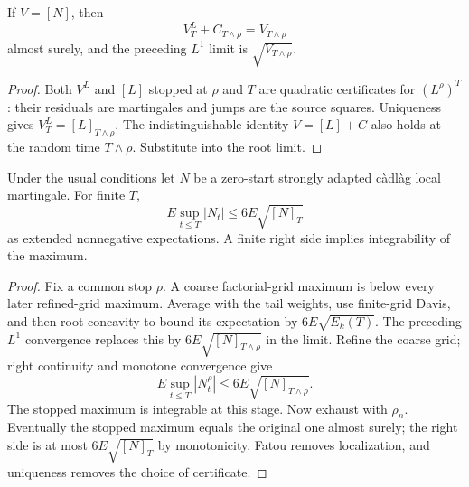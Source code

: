 \begin{lemma}
If $V=[N]$, then
\[
 V^L_T+C_{T\wedge\rho}=V_{T\wedge\rho}
\]
 almost surely,
and the preceding $L^1$ limit is $\sqrt{V_{T\wedge\rho}}$.
\end{lemma}
\begin{proof}
Both $V^L$ and $[L]$ stopped at $\rho$ and $T$ are quadratic certificates
for $(L^\rho)^T$: their residuals are martingales and jumps are the source
squares. Uniqueness gives $V^L_T=[L]_{T\wedge\rho}$.
The indistinguishable identity $V=[L]+C$ also holds at the random time
$T\wedge\rho$. Substitute into the root limit.
\end{proof}
\begin{lemma}
Under the usual conditions let $N$ be a zero-start strongly adapted
c\`adl\`ag local martingale. For finite $T$,
\[
 E\sup_{t\leq T}|N_t|\leq6E\sqrt{[N]_T}
\]
 as extended
nonnegative expectations. A finite right side implies integrability of the maximum.
\end{lemma}
\begin{proof}
Fix a common stop $\rho$. A coarse factorial-grid maximum is below every
later refined-grid maximum. Average with the tail weights, use finite-grid
Davis, and then root concavity to bound its expectation by $6E\sqrt{E_k(T)}$.
The preceding $L^1$ convergence replaces this by
$6E\sqrt{[N]_{T\wedge\rho}}$ in the limit. Refine the coarse grid;
right continuity and monotone convergence give
\[
 E\sup_{t\leq T}|N^\rho_t|\leq6E\sqrt{[N]_{T\wedge\rho}}.
\]
The stopped maximum is integrable at this stage.
Now exhaust with $\rho_n$. Eventually the stopped maximum equals the original
one almost surely; the right side is at most $6E\sqrt{[N]_T}$ by monotonicity.
Fatou removes localization, and uniqueness removes the choice of certificate.
\end{proof}

